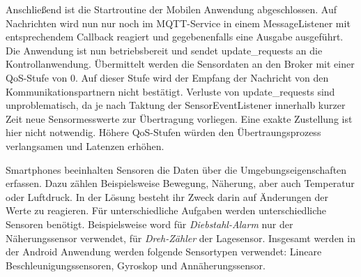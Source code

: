 \documentclass[11pt,a4paper]{report}
\begin{document}
Anschließend ist die Startroutine der Mobilen Anwendung abgeschlossen.
Auf Nachrichten wird nun nur noch im MQTT-Service in einem MessageListener mit entsprechendem Callback reagiert und gegebenenfalls eine Ausgabe ausgeführt.
Die Anwendung ist nun betriebsbereit und sendet update\_requests an die Kontrollanwendung.
Übermittelt werden die Sensordaten an den Broker mit einer QoS-Stufe von 0.
Auf dieser Stufe wird der Empfang der Nachricht von den Kommunikationspartnern nicht bestätigt.
Verluste von update\_requests sind unproblematisch, da je nach Taktung der SensorEventListener innerhalb kurzer Zeit neue Sensormesswerte zur Übertragung vorliegen.
Eine exakte Zustellung ist hier nicht notwendig.
Höhere QoS-Stufen würden den Übertraungsprozess verlangsamen und Latenzen erhöhen.

Smartphones beeinhalten Sensoren die Daten über die Umgebungseigenschaften erfassen.
Dazu zählen Beispielsweise Bewegung, Näherung, aber auch Temperatur oder Luftdruck.
In der Lösung besteht ihr Zweck darin auf Änderungen der Werte zu reagieren.
Für unterschiedliche Aufgaben werden unterschiedliche Sensoren benötigt.
Beispielsweise word für \textit{Diebstahl-Alarm} nur der Näherungssensor verwendet, für \textit{Dreh-Zähler} der Lagesensor.
Insgesamt werden in der Android Anwendung werden folgende Sensortypen verwendet: Lineare Beschleunigungssensoren, Gyroskop und Annäherungssensor.
\end{document}
